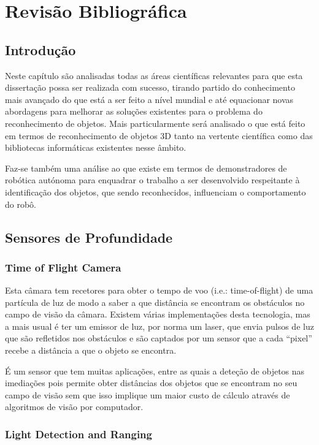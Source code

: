 \chapter{Revisão Bibliográfica} \label{chap:sota}

\section{Introdução}

Neste capítulo são analisadas todas as áreas científicas relevantes para que esta dissertação possa ser realizada com sucesso, tirando partido do conhecimento mais avançado do que está a ser feito a nível mundial e até equacionar novas abordagens para melhorar as soluções existentes para o problema do reconhecimento de objetos. Mais particularmente será analisado o que está feito em termos de reconhecimento de objetos 3D tanto na vertente científica como das bibliotecas informáticas existentes nesse âmbito.

Faz-se também uma análise ao que existe em termos de demonstradores de robótica autónoma para enquadrar o trabalho a ser desenvolvido respeitante à identificação dos objetos, que sendo reconhecidos, influenciam o comportamento do robô.

\section{Sensores de Profundidade}

\subsection{Time of Flight Camera}

Esta câmara tem recetores para obter o tempo de voo (i.e.: time-of-flight)
de uma partícula de luz de modo a saber a que distância se encontram os
obstáculos no campo de visão da câmara. Existem várias implementações desta
tecnologia, mas a mais usual é ter um emissor de luz, por norma um laser,
que envia pulsos de luz que são refletidos nos obstáculos e são captados por
um sensor que a cada “pixel” recebe a distância a que o objeto se encontra.

É um sensor que tem muitas aplicações, entre as quais a deteção de objetos nas imediações pois permite obter distâncias dos objetos que se encontram no seu campo de visão sem que isso implique um maior custo de cálculo através de algoritmos de visão por computador. 

\subsection[LIDAR]{Light Detection and Ranging}

